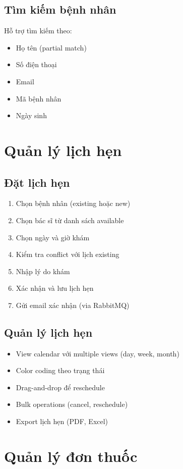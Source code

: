 \documentclass[12pt,a4paper]{report}
\begin{document}
\subsection{Tìm kiếm bệnh nhân}
Hỗ trợ tìm kiếm theo:
\begin{itemize}
    \item Họ tên (partial match)
    \item Số điện thoại
    \item Email
    \item Mã bệnh nhân
    \item Ngày sinh
\end{itemize}

\section{Quản lý lịch hẹn}

\subsection{Đặt lịch hẹn}
\begin{enumerate}
    \item Chọn bệnh nhân (existing hoặc new)
    \item Chọn bác sĩ từ danh sách available
    \item Chọn ngày và giờ khám
    \item Kiểm tra conflict với lịch existing
    \item Nhập lý do khám
    \item Xác nhận và lưu lịch hẹn
    \item Gửi email xác nhận (via RabbitMQ)
\end{enumerate}

\subsection{Quản lý lịch hẹn}
\begin{itemize}
    \item View calendar với multiple views (day, week, month)
    \item Color coding theo trạng thái
    \item Drag-and-drop để reschedule
    \item Bulk operations (cancel, reschedule)
    \item Export lịch hẹn (PDF, Excel)
\end{itemize}

\section{Quản lý đơn thuốc}
\end{document}
